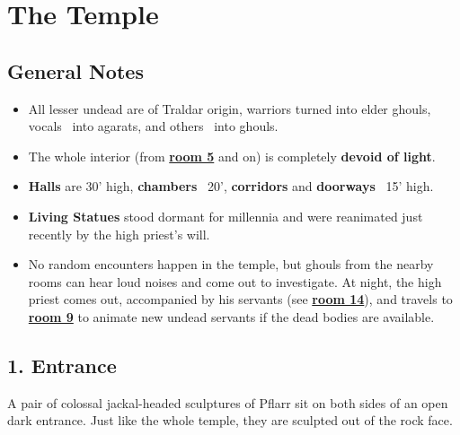 \documentclass[english,11pt,openany,letterpaper,twocolumn]{book}
\begin{document}
\skipline[0pt]

\noindent
\begin{minipage}{\textwidth}
	\setmonofont{TruetypewriterPolyglOTT}
	\renewcommand{\FancyVerbFormatLine}[1]{\vspace*{-0.5ex}#1}
	{\hfill
	\hfill}
\end{minipage}

\vfill
\break


\chapter{The Temple}

\section{General Notes}

\begin{itemize}[leftmargin=*]
\item
All lesser undead are of Traldar origin, warriors turned into elder ghouls, vocals \dash\ into agarats, and others \dash\ into ghouls.
\item
The whole interior (from \hyperlink{room5}{\textbf{room 5}} and on) is completely \textbf{devoid of light}.
\item
\textbf{Halls} are 30' high, \textbf{chambers} \dash\ 20', \textbf{corridors} and \textbf{doorways} \dash\ 15' high.
\item \textbf{Living Statues} stood dormant for millennia and were reanimated just recently by the high priest's will.
\item No random encounters happen in the temple, but ghouls from the nearby rooms can hear loud noises and come out to investigate. At night, the high priest comes out, accompanied by his servants (see \hyperlink{room14}{\textbf{room 14}}), and travels to \hyperlink{room9}{\textbf{room 9}} to animate new undead servants if the dead bodies are available.
\end{itemize}


\hypertarget{room1}{}
\section{1. Entrance}

A pair of colossal jackal-headed sculptures of Pflarr sit on both sides of an open dark entrance. Just like the whole temple, they are sculpted out of the rock face.
\end{document}
